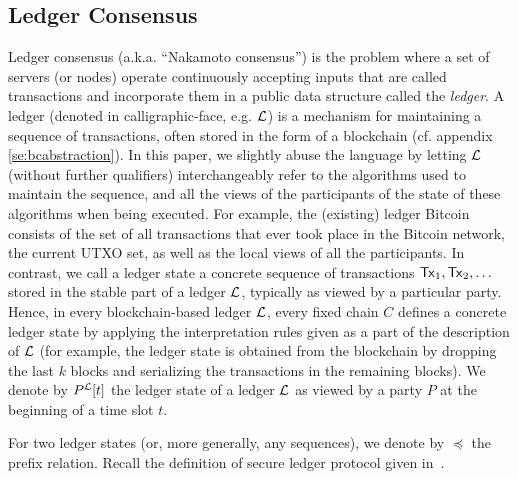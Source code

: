\subsection{Ledger Consensus}
Ledger consensus (a.k.a. ``Nakamoto consensus'') is the problem where a set of servers
(or nodes) operate continuously accepting inputs
that are called transactions and incorporate them in a public data 
structure called the {\em ledger}. 
A ledger (denoted in calligraphic-face, e.g. $\mathcal{L}$) is a mechanism for maintaining a sequence of transactions, often
stored in the form of a blockchain (cf. appendix \ref{se:bcabstraction}). In this paper, we slightly abuse the language by letting $\mathcal{L}$ (without further
qualifiers) interchangeably refer to the algorithms used to maintain the sequence, and all the views of the
participants of the state of these algorithms when being executed. For example, the (existing) ledger Bitcoin
consists of the set of all transactions that ever took place in the Bitcoin network, the current UTXO set, as
well as the local views of all the participants.
In contrast, we call a ledger state a concrete sequence of transactions $\mathsf{Tx}_1,\mathsf{Tx}_2,\dots$ stored in the stable
part of a ledger $\mathcal{L}$, typically as viewed by a particular party. Hence, in every blockchain-based ledger $\mathcal{L}$,
every fixed chain $C$ defines a concrete ledger state by applying the interpretation rules given as a part of the
description of $\mathcal{L}$ %
(for example, the ledger state is obtained from the blockchain by dropping the last $k$ blocks
and serializing the transactions in the remaining blocks). We denote by $P^{\mathcal{L}}[t]$
the ledger state of a ledger $\mathcal{L}$ as viewed by a party $P$ at the beginning of a time slot $t$.


For two ledger states (or, more generally, any sequences), we denote by $\preceq$ the prefix relation.
Recall the definition of secure ledger protocol given in~\cite{sok}.




